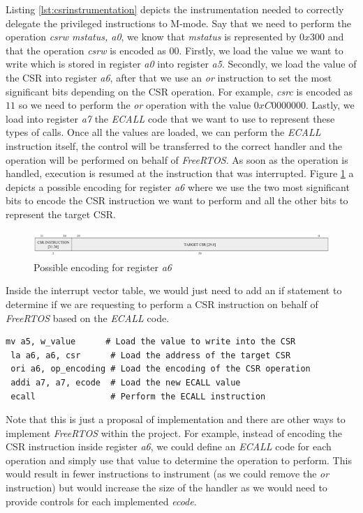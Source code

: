 Listing \ref{lst:csrinstrumentation} depicts the instrumentation needed to
correctly delegate the privileged instructions to M-mode. Say that we need to perform
the operation \textit{csrw mstatus, a0}, we know that \textit{mstatus} is
represented by $0x300$ and that the operation \textit{csrw} is encoded as $00$.
Firstly, we load the value we want to write which is stored in register \textit{a0}
into register \textit{a5}. Secondly, we load the value of the CSR into register \textit{a6},
after that we use an \textit{or} instruction to set the most significant bits
depending on the CSR operation. For example, \textit{csrc} is encoded as $11$ so
we need to perform the \textit{or} operation with the value $0xC0000000$. Lastly,
we load into register \textit{a7} the \textit{ECALL} code that we want to use to
represent these types of calls. Once all the values are loaded, we can perform
the \textit{ECALL} instruction itself, the control will be transferred to the
correct handler and the operation will be performed on behalf of \textit{FreeRTOS}.
As soon as the operation is handled, execution is resumed at the instruction that
was interrupted. Figure \ref{fig:a6encoding} a depicts a possible encoding for
register \textit{a6} where we use the two most significant bits to encode the CSR
instruction we want to perform and all the other bits to represent the target CSR.
\\
\begin{figure}[htbp]
  \centering
  \includegraphics[width=.9\linewidth]{images/freertos_encoding.png}
  \caption{Possible encoding for register \textit{a6}}
  \label{fig:a6encoding}
\end{figure}

Inside the interrupt vector table, we would just need to add an if statement to
determine if we are requesting to perform a CSR instruction on behalf of \textit{FreeRTOS}
based on the \textit{ECALL} code. \\ \begin{lstlisting}[style=Assembly, caption = \textit{FreeRTOS} instrumentation for Control and Status Register operations, label={lst:csrinstrumentation}]
 mv a5, w_value      # Load the value to write into the CSR
 la a6, a6, csr      # Load the address of the target CSR
 ori a6, op_encoding # Load the encoding of the CSR operation
 addi a7, a7, ecode  # Load the new ECALL value
 ecall               # Perform the ECALL instruction
\end{lstlisting}

Note that this is just a proposal of implementation and there are other ways to
implement \textit{FreeRTOS} within the project. For example, instead of encoding
the CSR instruction inside register \textit{a6}, we could define an \textit{ECALL}
code for each operation and simply use that value to determine the operation to
perform. This would result in fewer instructions to instrument (as we could
remove the \textit{or} instruction) but would increase the size of the handler
as we would need to provide controls for each implemented \textit{ecode}.
